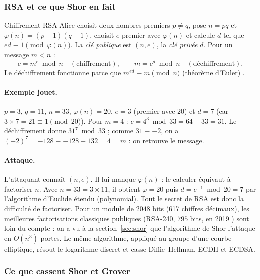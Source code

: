 \subsubsection{RSA et ce que Shor en fait}

\begin{definition}{Chiffrement RSA}
Alice choisit deux nombres premiers $p\neq q$, pose $n=pq$ et $\varphi(n)=(p-1)(q-1)$, choisit $e$ premier avec
$\varphi(n)$ et calcule $d$ tel que $ed\equiv1\pmod{\varphi(n)}$. La \emph{clé publique} est $(n,e)$, la \emph{clé
privée} $d$. Pour un message $m<n$ :
\[
  c=m^e\bmod n\quad(\text{chiffrement}),\qquad m=c^d\bmod n\quad(\text{déchiffrement}).
\]
Le déchiffrement fonctionne parce que $m^{ed}\equiv m\pmod n$ (théorème d'Euler) \parencite{rivest1978}.
\end{definition}

\paragraph{Exemple jouet.} $p=3$, $q=11$, $n=33$, $\varphi(n)=20$, $e=3$ (premier avec $20$) et $d=7$ (car
$3\times7=21\equiv1\pmod{20}$). Pour $m=4$ : $c=4^3\bmod33=64-33=31$. Le déchiffrement donne
$31^7\bmod33$ ; comme $31\equiv-2$, on a $(-2)^7=-128\equiv-128+132=4=m$ : on retrouve le message.

\paragraph{Attaque.} L'attaquant connaît $(n,e)$. Il lui manque $\varphi(n)$ : le calculer équivaut à
factoriser $n$. Avec $n=33=3\times11$, il obtient $\varphi=20$ puis $d=e^{-1}\bmod20=7$ par l'algorithme d'Euclide
étendu (polynomial). Tout le secret de RSA est donc la difficulté de factoriser. Pour un module de $2048$ bits
(617 chiffres décimaux), les meilleures factorisations classiques publiques (RSA-240, $795$ bits, en 2019
\parencite{boudot2020}) sont loin du compte : on a vu à la section~\ref{sec:shor} que
l'algorithme de Shor l'attaque en $O(n^3)$ portes. Le même algorithme, appliqué au groupe d'une courbe elliptique,
résout le logarithme discret et casse Diffie--Hellman, ECDH et ECDSA.

\subsubsection{Ce que cassent Shor et Grover}

